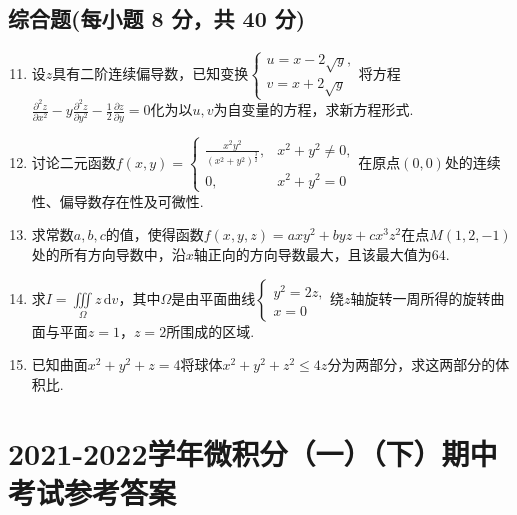 \documentclass[../Main.tex]{subfiles}
\begin{document}
\section{综合题(每小题 8 分，共 40 分)}
\begin{enumerate}
    \setcounter{enumi}{10}
    \item 设$z$具有二阶连续偏导数，已知变换$\begin{cases}
                  u=x-2\sqrt{y}, \\
                  v=x+2\sqrt{y}
              \end{cases}$将方程$\frac{\partial^{2} z}{\partial x^{2}}-y\frac{\partial^{2}
                  z}{\partial y^{2}}-\frac{1}{2}\frac{\partial z}{\partial y}=0$化为以$u,v$为自变量的方程，求新方程形式.
          \vspace{10em}

    \item 讨论二元函数$f(x,y)=
              \begin{cases}
                  \frac{x^2y^2}{\left(x^{2}+y^{2}\right)^{\frac{3}{2}}}, & x^{2}+y^{2}\neq 0, \\
                  0,                                                     & x^{2}+y^{2}=0
              \end{cases}$在原点$(0,0)$处的连续性、偏导数存在性及可微性.
          \vspace{11em}

    \item 求常数$a,b,c$的值，使得函数$f(x,y,z)=axy^{2}+byz+cx^{3}z^{2}$在点$M
              (1,2,-1)$处的所有方向导数中，沿$x$轴正向的方向导数最大，且该最大值为$64$.
          \vspace{11em}

    \item 求$I=\iiint\limits_{\Omega}z\,\mathrm{d}v$，其中$\Omega$是由平面曲线$\begin{cases}
                  y^{2}=2z, \\
                  x=0
              \end{cases}$绕$z$轴旋转一周所得的旋转曲面与平面$z=1$，$z=2$所围成的区域.
          \vspace{11em}

    \item 已知曲面$x^{2}+y^{2}+z=4$将球体$x^{2}+y^{2}+z^{2}\leq 4z$分为两部分，求这两部分的体积比.
          \vspace{11em}
\end{enumerate}

\chapter{2021-2022学年微积分（一）（下）期中考试参考答案}
\end{document}
